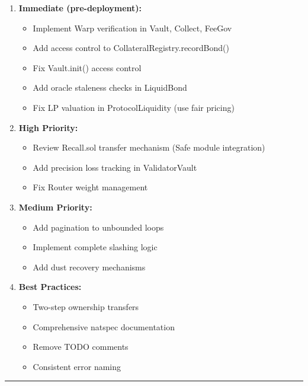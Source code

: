 \documentclass[
]{article}
\providecommand{\tightlist}{%
  \setlength{\itemsep}{0pt}\setlength{\parskip}{0pt}}
\begin{document}
\begin{enumerate}
\def\labelenumi{\arabic{enumi}.}
\item
  \textbf{Immediate (pre-deployment):}

  \begin{itemize}
  \tightlist
  \item
    Implement Warp verification in Vault, Collect, FeeGov
  \item
    Add access control to CollateralRegistry.recordBond()
  \item
    Fix Vault.init() access control
  \item
    Add oracle staleness checks in LiquidBond
  \item
    Fix LP valuation in ProtocolLiquidity (use fair pricing)
  \end{itemize}
\item
  \textbf{High Priority:}

  \begin{itemize}
  \tightlist
  \item
    Review Recall.sol transfer mechanism (Safe module integration)
  \item
    Add precision loss tracking in ValidatorVault
  \item
    Fix Router weight management
  \end{itemize}
\item
  \textbf{Medium Priority:}

  \begin{itemize}
  \tightlist
  \item
    Add pagination to unbounded loops
  \item
    Implement complete slashing logic
  \item
    Add dust recovery mechanisms
  \end{itemize}
\item
  \textbf{Best Practices:}

  \begin{itemize}
  \tightlist
  \item
    Two-step ownership transfers
  \item
    Comprehensive natspec documentation
  \item
    Remove TODO comments
  \item
    Consistent error naming
  \end{itemize}
\end{enumerate}

\begin{center}\rule{0.5\linewidth}{0.5pt}\end{center}
\end{document}
